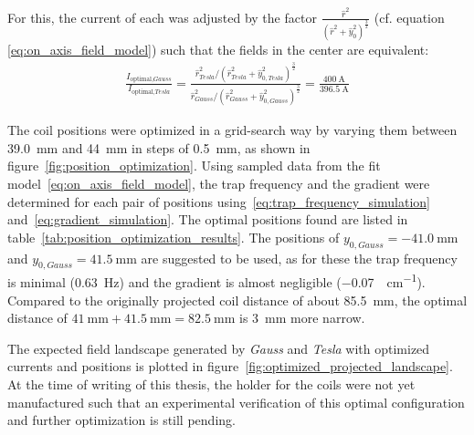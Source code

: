 For this, the current of each was adjusted by the factor $\frac{\hat r^2}{(\hat r^2 + \hat y_0^2)^\frac{3}{2}}$ (cf. equation \eqref{eq:on_axis_field_model}) such that the fields in the center are equivalent:
\begin{align}
    \frac{I_{\text{optimal}, \textit{Gauss}}}{I_{\text{optimal}, \textit{Tesla}}} = \frac{\hat r_\textit{Tesla}^2 / (\hat r_\textit{Tesla}^2 + \hat y_{0, \textit{Tesla}}^2)^\frac{3}{2}}{\hat r_\textit{Gauss}^2 / (\hat r_\textit{Gauss}^2 + \hat y_{0, \textit{Gauss}}^2)^\frac{3}{2}} = \frac{\SI{400}{\ampere}}{\SI{396.5}{\ampere}}
\end{align}

The coil positions were optimized in a grid-search way by varying them between \SI{39.0}{\milli\meter} and \SI{44}{\milli\meter} in steps of \SI{0.5}{\milli\meter}, as shown in figure~\ref{fig:position_optimization}. Using sampled data from the fit model~\eqref{eq:on_axis_field_model}, the trap frequency and the gradient were determined for each pair of positions using~\eqref{eq:trap_frequency_simulation} and~\eqref{eq:gradient_simulation}.
The optimal positions found are listed in table~\ref{tab:position_optimization_results}. The positions of $y_{0, \textit{Gauss}} = \SI{-41.0}{\milli\meter}$ and $y_{0, \textit{Gauss}} = \SI{41.5}{\milli\meter}$ are suggested to be used, as for these the trap frequency is minimal (\SI{0.63}{\hertz}) and the gradient is almost negligible (\SI{-0.07}{\gauss\per\centi\meter}). Compared to the originally projected coil distance of about \SI{85.5}{\milli\meter}, the optimal distance of $\SI{41}{\milli\meter} + \SI{41.5}{\milli\meter} = \SI{82.5}{\milli\meter}$ is \SI{3}{\milli\meter} more narrow.

The expected field landscape generated by \textit{Gauss} and \textit{Tesla} with optimized currents and positions is plotted in figure~\ref{fig:optimized_projected_landscape}. At the time of writing of this thesis, the holder for the coils were not yet manufactured such that an experimental verification of this optimal configuration and further optimization is still pending.

